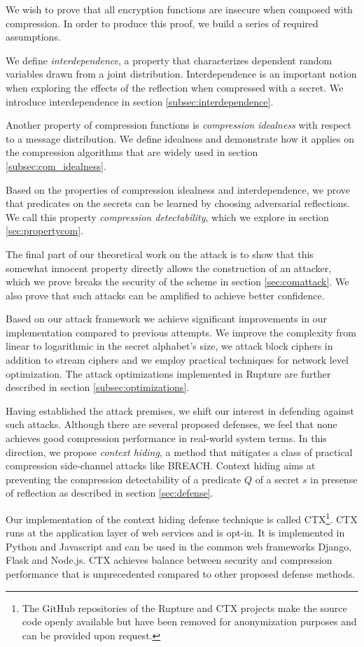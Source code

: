 We wish to prove that all encryption functions are insecure when composed with
compression. In order to produce this proof, we build a series of required
assumptions.

We define \textit{interdependence}, a property that characterizes dependent
random variables drawn from a joint distribution. Interdependence is an
important notion when exploring the effects of the reflection when compressed
with a secret. We introduce interdependence in section
\ref{subsec:interdependence}.

Another property of compression functions is \textit{compression idealness} with
respect to a message distribution. We define idealness and demonstrate how it
applies on the compression algorithms that are widely used in section
\ref{subsec:com_idealness}.

Based on the properties of compression idealness and interdependence, we prove
that predicates on the secrets can be learned by choosing adversarial
reflections. We call this property \textit{compression detectability}, which we
explore in section \ref{sec:propertycom}.

The final part of our theoretical work on the attack is to show that this
somewhat innocent property directly allows the construction of an attacker,
which we prove breaks the security of the scheme in section \ref{sec:comattack}.
We also prove that such attacks can be amplified to achieve better confidence.

Based on our attack framework we achieve significant improvements in our
implementation compared to previous attempts. We improve the complexity from
linear to logarithmic in the secret alphabet's size, we attack block ciphers in
addition to stream ciphers and we employ practical techniques for network level
optimization. The attack optimizations implemented in Rupture are further
described in section \ref{subsec:optimizations}.

Having established the attack premises, we shift our interest in defending
against such attacks. Although there are several proposed defenses, we feel that
none achieves good compression performance in real-world system terms. In this
direction, we propose \textit{context hiding}, a method that mitigates a class
of practical compression side-channel attacks like BREACH. Context hiding aims
at preventing the compression detectability of a predicate $Q$ of a secret $s$
in presense of reflection as described in section \ref{sec:defense}.

Our implementation of the context hiding defense technique is called
CTX\footnote[1]{The GitHub repositories of the Rupture and CTX projects make the
source code openly available but have been removed for anonymization purposes
and can be provided upon request.}. CTX runs at the application layer of web
services and is opt-in. It is implemented in Python and Javascript and can be
used in the common web frameworks Django, Flask and Node.js. CTX achieves
balance between security and compression performance that is unprecedented
compared to other proposed defense methods.

